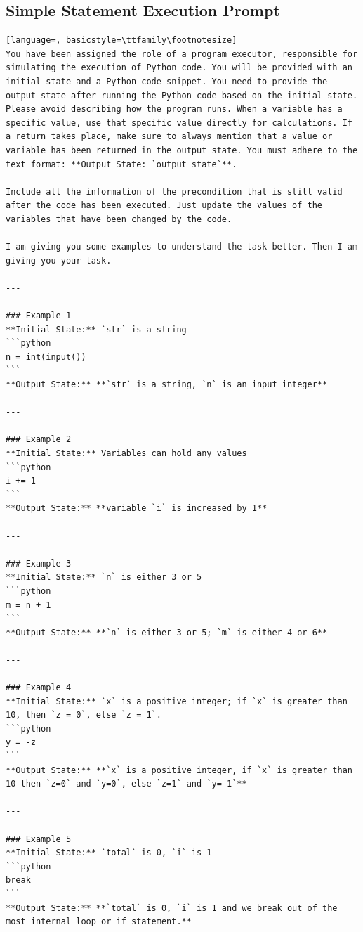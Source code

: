 \documentclass[sigconf]{acmart}
\begin{document}
\subsection{Simple Statement Execution Prompt}
\label{simple_statement_prompt}
\begin{tcolorbox}[ colback=gray!10, colframe=black, arc=5pt]
\begin{lstlisting}[language=, basicstyle=\ttfamily\footnotesize]
You have been assigned the role of a program executor, responsible for simulating the execution of Python code. You will be provided with an initial state and a Python code snippet. You need to provide the output state after running the Python code based on the initial state. Please avoid describing how the program runs. When a variable has a specific value, use that specific value directly for calculations. If a return takes place, make sure to always mention that a value or variable has been returned in the output state. You must adhere to the text format: **Output State: `output state`**.

Include all the information of the precondition that is still valid after the code has been executed. Just update the values of the variables that have been changed by the code.

I am giving you some examples to understand the task better. Then I am giving you your task.

---

### Example 1  
**Initial State:** `str` is a string  
```python
n = int(input())
```
**Output State:** **`str` is a string, `n` is an input integer**

---

### Example 2  
**Initial State:** Variables can hold any values  
```python
i += 1
```
**Output State:** **variable `i` is increased by 1**

---

### Example 3  
**Initial State:** `n` is either 3 or 5  
```python
m = n + 1
```
**Output State:** **`n` is either 3 or 5; `m` is either 4 or 6**

---

### Example 4  
**Initial State:** `x` is a positive integer; if `x` is greater than 10, then `z = 0`, else `z = 1`.  
```python
y = -z
```
**Output State:** **`x` is a positive integer, if `x` is greater than 10 then `z=0` and `y=0`, else `z=1` and `y=-1`**

---

### Example 5  
**Initial State:** `total` is 0, `i` is 1  
```python
break
```
**Output State:** **`total` is 0, `i` is 1 and we break out of the most internal loop or if statement.**

\end{lstlisting}
\end{tcolorbox}
\end{document}
